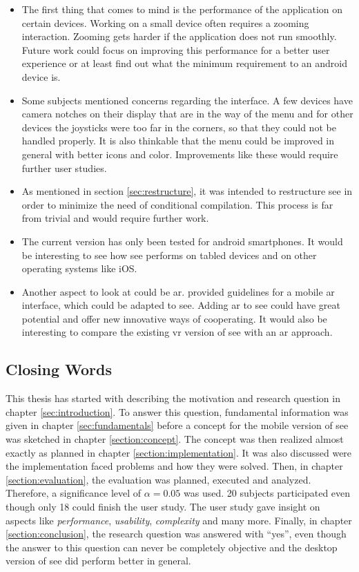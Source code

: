 \begin{itemize}
    \item The first thing that comes to mind is the performance of the application on certain devices. 
    Working on a small device often requires a zooming interaction.
    Zooming gets harder if the application does not run smoothly. 
    Future work could focus on improving this performance for a better user experience or at least find out what the minimum requirement to an \gls{android} device is.
    \item Some subjects mentioned concerns regarding the interface. 
    A few devices have camera notches on their display that are in the way of the menu and for other devices the joysticks were too far in the corners, so that they could not be handled properly.
    It is also thinkable that the menu could be improved in general with better icons and color.
    Improvements like these would require further user studies. 
    \item As mentioned in section \ref{sec:restructure}, it was intended to restructure \gls{see} in order to minimize the need of conditional compilation.
    This process is far from trivial and would require further work. 
    \item The current version has only been tested for \gls{android} smartphones.
    It would be interesting to see how \gls{see} performs on tabled devices and on other operating systems like iOS.
    \item Another aspect to look at could be \gls{ar}. \cite{santos2016guidelines} provided guidelines for a mobile \gls{ar} interface, which could be adapted to \gls{see}. 
    Adding \gls{ar} to \gls{see} could have great potential and offer new innovative ways of cooperating. 
    It would also be interesting to compare the existing \gls{vr} version of \gls{see} with an \gls{ar} approach.
\end{itemize}

\subsection{Closing Words}

This thesis has started with describing the motivation and research question in chapter \ref{sec:introduction}.
To answer this question, fundamental information was given in chapter \ref{sec:fundamentals} before a concept for the mobile version of \gls{see} was sketched in chapter \ref{section:concept}.
The concept was then realized almost exactly as planned in chapter \ref{section:implementation}.
It was also discussed were the implementation faced problems and how they were solved.
Then, in chapter \ref{section:evaluation}, the evaluation was planned, executed and analyzed. 
Therefore, a significance level of $\alpha = 0.05$ was used.
20 subjects participated even though only 18 could finish the user study. 
The user study gave insight on aspects like \textit{performance}, \textit{usability}, \textit{complexity} and many more.
Finally, in chapter \ref{section:conclusion}, the research question was answered with \enquote{yes}, even though the answer to this question can never be completely objective and the desktop version of \gls{see} did perform better in general.